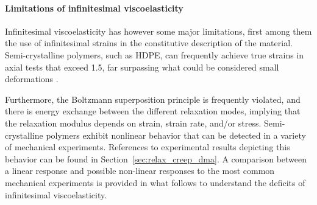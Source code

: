\paragraph{Limitations of infinitesimal viscoelasticity}
Infinitesimal viscoelasticity has however some major limitations, first among them the use of infinitesimal strains in the constitutive description of the material.
Semi-crystalline polymers, such as HDPE, can frequently achieve true strains in axial tests that exceed 1.5, far surpassing what could be considered small deformations \citep{gsellYieldTransientEffects1981}.

Furthermore, the Boltzmann superposition principle is frequently violated, and there is energy exchange between the different relaxation modes, implying that the relaxation modulus depends on strain, strain rate, and/or stress.
Semi-crystalline polymers exhibit nonlinear behavior that can be detected in a variety of mechanical experiments.
References to experimental results depicting this behavior can be found in Section~\ref{sec:relax_creep_dma}.
A comparison between a linear response and possible non-linear responses to the most common mechanical experiments is provided in what follows to understand the deficits of infinitesimal viscoelasticity.

